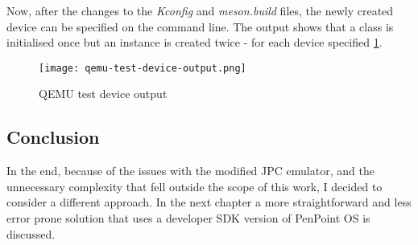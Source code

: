 \begin{codeblock}
    
\end{codeblock}

\noindent
Now, after the changes to the \emph{Kconfig} and \emph{meson.build} files, the
newly created device can be specified on the command line. The output shows
that a class is initialised  once but an instance is created twice - for each
device specified \ref{fig:qemu-test-device-output}.

\begin{figure}[H]
    \centering
    \texttt{[image: qemu-test-device-output.png]}
    \caption{QEMU test device output}
    \label{fig:qemu-test-device-output}
\end{figure}

\subsection{Conclusion}


In the end, because of the issues with the modified JPC emulator, and the unnecessary
complexity that fell outside the scope of this work, I decided to consider
a different approach.  In the next chapter a more straightforward and less error
prone solution that uses a developer SDK version of PenPoint OS is discussed.

